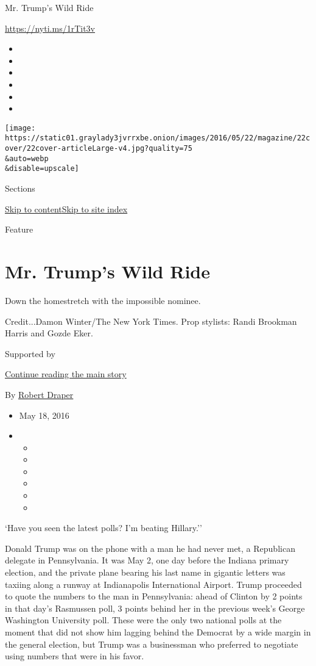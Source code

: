 Mr. Trump's Wild Ride

\url{https://nyti.ms/1rTit3v}

\begin{itemize}
\item
\item
\item
\item
\item
\item
\end{itemize}

\texttt{[image: https://static01.graylady3jvrrxbe.onion/images/2016/05/22/magazine/22cover/22cover-articleLarge-v4.jpg?quality=75\\\&auto=webp\\\&disable=upscale]}

Sections

\protect\hyperlink{site-content}{Skip to
content}\protect\hyperlink{site-index}{Skip to site index}

Feature

\hypertarget{mr-trumps-wild-ride}{%
\section{Mr. Trump's Wild Ride}\label{mr-trumps-wild-ride}}

Down the homestretch with the impossible nominee.

Credit...Damon Winter/The New York Times. Prop stylists: Randi Brookman
Harris and Gozde Eker.

Supported by

\protect\hyperlink{after-sponsor}{Continue reading the main story}

By \href{http://www.nytimes3xbfgragh.onion/by/robert-draper}{Robert
Draper}

\begin{itemize}
\item
  May 18, 2016
\item
  \begin{itemize}
  \item
  \item
  \item
  \item
  \item
  \item
  \end{itemize}
\end{itemize}

`Have you seen the latest polls? I'm beating Hillary.''

Donald Trump was on the phone with a man he had never met, a Republican
delegate in Pennsylvania. It was May 2, one day before the Indiana
primary election, and the private plane bearing his last name in
gigantic letters was taxiing along a runway at Indianapolis
International Airport. Trump proceeded to quote the numbers to the man
in Pennsylvania: ahead of Clinton by 2 points in that day's Rasmussen
poll, 3 points behind her in the previous week's George Washington
University poll. These were the only two national polls at the moment
that did not show him lagging behind the Democrat by a wide margin in
the general election, but Trump was a businessman who preferred to
negotiate using numbers that were in his favor.

